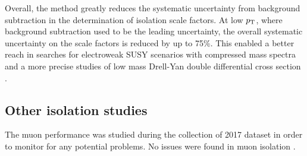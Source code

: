 Overall, the method greatly reduces the systematic uncertainty from
background subtraction in the determination of isolation scale factors.
At low $p_{\text{T}}$, where background subtraction used to be the leading
uncertainty, the overall systematic uncertainty on the scale factors
is reduced by up to 75\%. This enabled a better reach in searches for
electroweak SUSY scenarios with compressed mass spectra
\cite{PhysRevD.97.052010} and a more precise studies of low mass
Drell-Yan double differential cross section \cite{Giuli:2681125}.

\subsection{Other isolation studies}

The muon performance was studied during the collection of 2017 dataset
in order to monitor for any potential problems. No issues were 
found in muon isolation \cite{Bellomo:2282672}.

